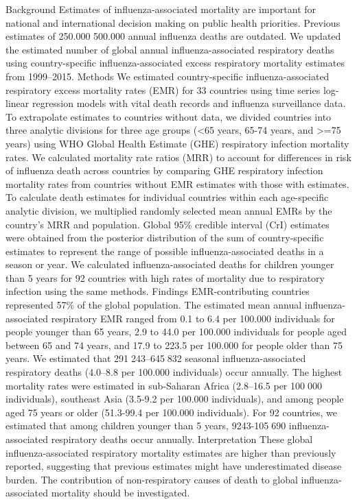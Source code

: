 \cite{iulianoEstimatesGlobalSeasonal2018}
Background
Estimates of influenza-associated mortality are important for national and
international decision making on public health priorities. Previous estimates
of 250.000 500.000 annual influenza deaths are outdated. We updated the
estimated number of global annual influenza-associated respiratory deaths using
country-specific influenza-associated excess respiratory mortality estimates
from 1999–2015.
Methods
We estimated country-specific influenza-associated respiratory excess mortality
rates (EMR) for 33 countries using time series log-linear regression models
with vital death records and influenza surveillance data. To extrapolate
estimates to countries without data, we divided countries into three analytic
divisions for three age groups (<65 years, 65-74 years, and >=75 years) using
WHO Global Health Estimate (GHE) respiratory infection mortality rates. We
calculated mortality rate ratios (MRR) to account for differences in risk of
influenza death across countries by comparing GHE respiratory infection
mortality rates from countries without EMR estimates with those with estimates.
To calculate death estimates for individual countries within each age-specific
analytic division, we multiplied randomly selected mean annual EMRs by the
country's MRR and population. Global 95\% credible interval (CrI) estimates were
obtained from the posterior distribution of the sum of country-specific
estimates to represent the range of possible influenza-associated deaths in a
season or year. We calculated influenza-associated deaths for children younger
than 5 years for 92 countries with high rates of mortality due to respiratory
infection using the same methods.
Findings
EMR-contributing countries represented 57\% of the global population. The
estimated mean annual influenza-associated respiratory EMR ranged from 0.1 to
6.4 per 100.000 individuals for people younger than 65 years, 2.9 to 44.0 per
100.000 individuals for people aged between 65 and 74 years, and 17.9 to 223.5
per 100.000 for people older than 75 years. We estimated that 291 243–645 832
seasonal influenza-associated respiratory deaths (4.0–8.8 per 100.000
individuals) occur annually. The highest mortality rates were estimated in
sub-Saharan Africa (2.8–16.5 per 100 000 individuals), southeast Asia (3.5-9.2
per 100.000 individuals), and among people aged 75 years or older (51.3-99.4
per 100.000 individuals). For 92 countries, we estimated that among children
younger than 5 years, 9243-105 690 influenza-associated respiratory deaths
occur annually.
Interpretation
These global influenza-associated respiratory mortality estimates are higher
than previously reported, suggesting that previous estimates might have
underestimated disease burden. The contribution of non-respiratory causes of
death to global influenza-associated mortality should be investigated.

